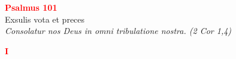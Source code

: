 


\def\greinitialformat#1{%
{\fontsize{39}{39}\selectfont #1}%
}




\vspace{0.3cm}
\begin{center}
 \textcolor{red}{\large \bf Psalmus 101}\\
Exsulis vota et preces\\
\textit{\small Consolatur nos Deus in omni tribulatione nostra. (2 Cor 1,4)}
\end{center}
\begin{center}
\textcolor{red}{\bf I}
\end{center}

